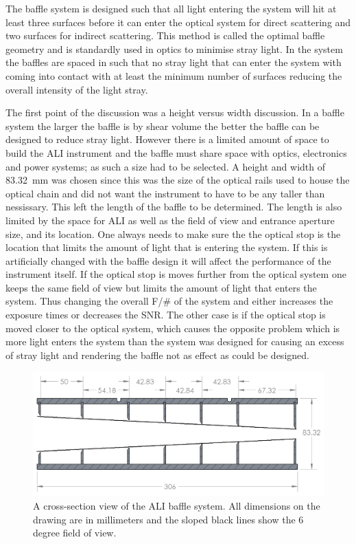 The baffle system is designed such that all light entering the system will hit at least three surfaces before it can enter the optical system for direct scattering and two surfaces for indirect scattering. This method is called the optimal baffle geometry and is standardly used in optics to minimise stray light. In the system the baffles are spaced in such that no stray light that can enter the system with coming into contact with at least the minimum number of surfaces reducing the overall intensity of the light stray.

The first point of the discussion was a height versus width discussion. In a baffle system the larger the baffle is by shear volume the better the baffle can be designed to reduce stray light. However there is a limited amount of space to build the ALI instrument and the baffle must share space with optics, electronics and power systems; as such a size had to be selected. A height and width of 83.32~mm was chosen since this was the size of the optical rails used to house the optical chain and did not want the instrument to have to be any taller than nessissary. This left the length of the baffle to be determined. The length is also limited by the space for ALI as well as the field of view and entrance aperture size, and its location. One always needs to make sure the the optical stop is the location that limits the amount of light that is entering the system. If this is artificially changed with the baffle design it will affect the performance of the instrument itself. If the optical stop is moves further from the optical system one keeps the same field of view but limits the amount of light that enters the system. Thus changing the overall F/\# of the system and either increases the exposure times or decreases the SNR. The other case is if the optical stop is moved closer to the optical system, which causes the opposite problem which is more light enters the system than the system was designed for causing an excess of stray light and rendering the baffle not as effect as could be designed.

\begin{figure}
        \includegraphics[width=1.0\textwidth]{./Images/3-3-BaffleAssembly.png}
        \caption[ALI Baffle Cross Section]{A cross-section view of the ALI baffle system. All dimensions on the drawing are
        in millimeters and the sloped black lines show the 6 degree field of view.}
        \label{fig:3.3:aliBaffleCrossSection}
\end{figure}

